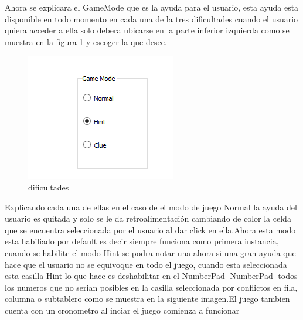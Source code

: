 \documentclass[12pt,oneside]{book}
\begin{document}
Ahora se explicara el GameMode que es la ayuda para el usuario, esta ayuda esta disponible en todo momento en cada una de la tres dificultades cuando el usuario quiera acceder a ella solo debera ubicarse en la parte inferior izquierda como se muestra en la figura \ref{dificultades} y escoger la que desee.


\begin{figure}[htbp]
\begin{center}
\includegraphics[width=.60\textwidth]{./imagenes/dificultades.png}
\caption{dificultades}
\label{dificultades}
\end{center}
\end{figure}

Explicando cada una de ellas en el caso de el modo de juego Normal la ayuda del usuario es quitada y solo se le da retroalimentación cambiando de color la celda que se encuentra seleccionada por el usuario al dar click en ella.Ahora esta modo esta habiliado por default es decir siempre funciona como primera instancia, cuando se habilite el modo Hint se podra notar una  ahora si una gran ayuda que hace que el usuario no se equivoque en todo el juego, cuando esta seleccionada esta casilla Hint lo que hace es deshabilitar en el NumberPad  \ref{NumberPad} todos los numeros que no serian posibles en la casilla seleccionada por conflictos en fila, columna o subtablero  como se muestra en la siguiente imagen.El juego tambien cuenta con un cronometro al inciar el juego comienza a funcionar
\end{document}
